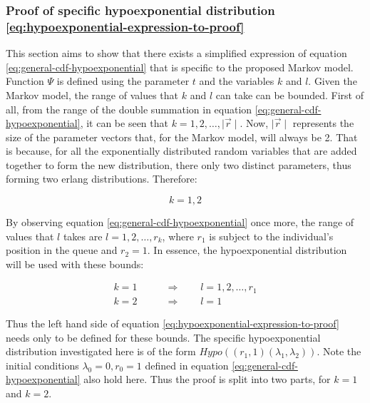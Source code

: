\subsubsection{Proof of specific hypoexponential distribution 
\ref{eq:hypoexponential-expression-to-proof}}
 
This section aims to show that there exists a simplified expression of equation 
\ref{eq:general-cdf-hypoexponential} that is specific to the proposed Markov 
model.
Function \(\Psi\) is defined using the parameter \(t\) and the variables \(k\) 
and \(l\).
Given the Markov model, the range of values that \(k\) and \(l\) can take can be
bounded.
First of all, from the range of the double summation in equation 
\ref{eq:general-cdf-hypoexponential}, it can be seen that 
\(k = 1, 2, \dots, \mid \vec{r} \mid\).
Now, \(\mid \vec{r} \mid\) represents the size of the parameter vectors that, 
for the Markov model, will always be 2. 
That is because, for all the exponentially distributed random variables that are
added together to form the new distribution, there only two distinct parameters,
thus forming two erlang distributions. Therefore:

\begin{equation*}
    k = 1, 2
\end{equation*}

By observing equation \ref{eq:general-cdf-hypoexponential} once more, the range
of values that \(l\) takes are \(l = 1, 2, \dots, r_k\), where \(r_1\) is 
subject to the individual's position in the queue and \(r_2 = 1\).
In essence, the hypoexponential distribution will be used with these bounds:

\begin{align}
    k = 1 & \qquad \Rightarrow \qquad l = 1, 2, \dots, r_1 \nonumber \\
    k = 2 & \qquad \Rightarrow \qquad l = 1
\end{align}

Thus the left hand side of equation \ref{eq:hypoexponential-expression-to-proof} 
needs only to be defined for these bounds. 
The specific hypoexponential distribution investigated here is of the form
\(Hypo((r_1, 1)(\lambda_1, \lambda_2))\).
Note the initial conditions \(\lambda_0=0, r_0=1\) defined in equation 
\ref{eq:general-cdf-hypoexponential} also hold here.
Thus the proof is split into two parts, for \(k=1\) and \(k=2\).



